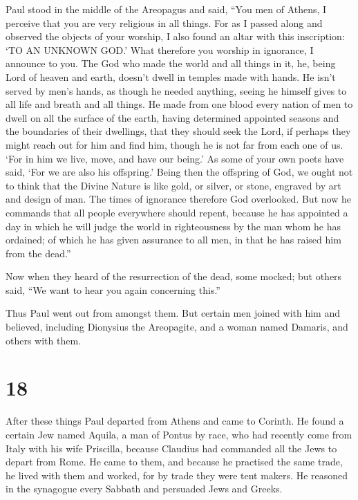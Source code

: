  Paul stood in the middle of the Areopagus and said,
``You men of Athens, I perceive that you are very religious in all
things.  For as I passed along and observed the objects
of your worship, I also found an altar with this inscription: `TO AN
UNKNOWN GOD.' What therefore you worship in ignorance, I announce to
you.  The God who made the world and all things in it,
he, being Lord of heaven and earth, doesn't dwell in temples made with
hands.  He isn't served by men's hands, as though he
needed anything, seeing he himself gives to all life and breath and all
things.  He made from one blood every nation of men to
dwell on all the surface of the earth, having determined appointed
seasons and the boundaries of their dwellings,  that they
should seek the Lord, if perhaps they might reach out for him and find
him, though he is not far from each one of us.  `For in
him we live, move, and have our being.' As some of your own poets have
said, `For we are also his offspring.'  Being then the
offspring of God, we ought not to think that the Divine Nature is like
gold, or silver, or stone, engraved by art and design of man.
 The times of ignorance therefore God overlooked. But now
he commands that all people everywhere should repent, 
because he has appointed a day in which he will judge the world in
righteousness by the man whom he has ordained; of which he has given
assurance to all men, in that he has raised him from the dead.''

 Now when they heard of the resurrection of the dead,
some mocked; but others said, ``We want to hear you again concerning
this.''

 Thus Paul went out from amongst them. 
But certain men joined with him and believed, including Dionysius the
Areopagite, and a woman named Damaris, and others with them.

\hypertarget{section-17}{%
\section{18}\label{section-17}}

 After these things Paul departed from Athens and came to
Corinth.  He found a certain Jew named Aquila, a man of
Pontus by race, who had recently come from Italy with his wife
Priscilla, because Claudius had commanded all the Jews to depart from
Rome. He came to them,  and because he practised the same
trade, he lived with them and worked, for by trade they were tent
makers.  He reasoned in the synagogue every Sabbath and
persuaded Jews and Greeks.


